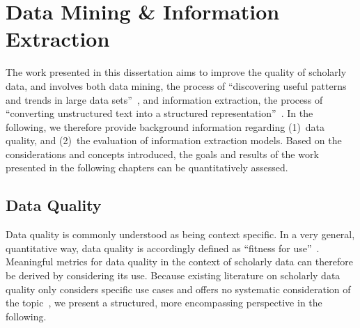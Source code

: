 \section{Data Mining \& Information Extraction}



The work presented in this dissertation aims to improve the quality of scholarly data, and involves both data mining, the process of ``discovering useful patterns and trends in large data sets''~\cite{Larose2014}, and information extraction, the process of ``converting unstructured text into a structured representation''~\cite{Aggarwal2018}. In the following, we therefore provide background information regarding (1)~data quality, and (2)~the evaluation of information extraction models. Based on the considerations and concepts introduced, the goals and results of the work presented in the following chapters can be quantitatively assessed.

\subsection{Data Quality}\label{sec:foundations-dataquality}


Data quality is commonly understood as being context specific. In a very general, quantitative way, data quality is accordingly defined as ``fitness for use''~\cite{Strong1997,Juran1999}. Meaningful metrics for data quality in the context of scholarly data can therefore be derived by considering its use. Because existing literature on scholarly data quality only considers specific use cases and offers no systematic consideration of the topic~\cite{Strotmann2015,Lauscher2018}, we present a structured, more encompassing perspective in the following.


